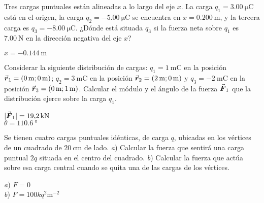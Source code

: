 %
\begin{center}
\end{center}
%
\begin{Exercise}
  Tres cargas puntuales están alineadas a lo largo del eje $x$. La carga $q_1 = \SI{3.00}{\micro\coulomb}$ está en el origen, la carga $q_2 = \SI{-5.00}{\micro\coulomb}$ se encuentra en $x = \SI{0.200}{\metre}$, y la tercera carga es $q_3 = \SI{-8.00}{\micro\coulomb}$. ¿Dónde está situada $q_3$ si la fuerza neta sobre $q_1$ es $\SI{7.00}{\newton}$ en la dirección negativa del eje $x$?
\end{Exercise}
\begin{Answer}
  $x = \SI{-0.144}{\metre}$
\end{Answer}
%
\begin{Exercise}
  Considerar la siguiente distribución de cargas: $q_1 = \SI{1}{\milli\coulomb}$ en la posición $\va*{r}_1 = (\SI{0}{\metre};\SI{0}{\metre})$; $q_2 = \SI{3}{\milli\coulomb}$ en la posición $\va*{r}_2 = (\SI{2}{\metre};\SI{0}{\metre})$ y $q_3 = \SI{-2}{\milli\coulomb}$ en la posición $\va*{r}_3 = (\SI{0}{\metre};\SI{1}{\metre})$. Calcular el módulo y el ángulo de la fuerza $\va*{F}_1$ que la distribución ejerce sobre la carga $q_1$.
\end{Exercise}
\begin{Answer}
  \begin{minipage}[t]{.5\textwidth}
    $|\va*{F}_1| = \SI{19.2}{\kilo\newton}$\\ $\theta = \SI{110.6}{\degree}$
  \end{minipage}
\end{Answer}
%
\begin{Exercise}
  Se tienen cuatro cargas puntuales idénticas, de carga $q$, ubicadas en los vértices de un cuadrado de $\SI{20}{\centi\metre}$ de lado. \textit{a}) Calcular la fuerza que sentirá una carga puntual $2q$ situada en el centro del cuadrado. \textit{b}) Calcular la fuerza que actúa sobre esa carga central cuando se quita una de las cargas de los vértices.
\end{Exercise}
\begin{Answer}
  \begin{minipage}[t]{.5\textwidth}
    \textit{a}) $F = 0$\\ \textit{b}) $F = 100kq^2\si{\metre^{-2}}$
  \end{minipage}
\end{Answer}
